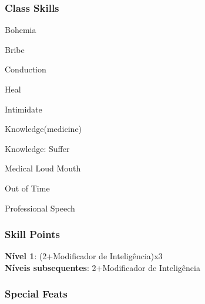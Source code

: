 \documentclass[ letterpaper,12pt]{article}
\begin{document}
\subsubsection{Class Skills}
\begin{itemize}
{\it
\item{Bohemia}
\item{Bribe}
\item{Conduction}
\item{Heal}
\item{Intimidate}
\item{Knowledge(medicine)}
\item{Knowledge: Suffer}
\item{Medical Loud Mouth}
\item{Out of Time}
\item{Professional Speech}
}
\end{itemize}

\subsubsection{Skill Points}
{\bf Nível 1}: (2+Modificador de Inteligência)x3\\
{\bf Níveis subsequentes}: 2+Modificador de Inteligência\\

\subsubsection{Special Feats}
\end{document}

